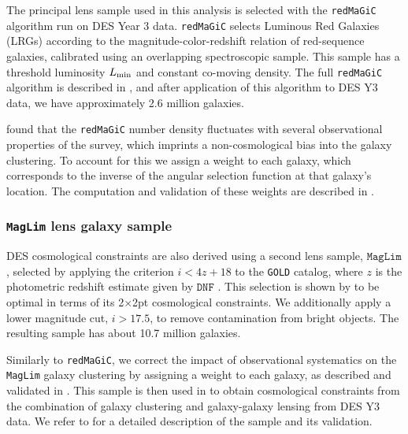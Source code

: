 \documentclass[aps, prd,twocolumn,superscriptaddress,nofootinbib,preprintnumbers]{revtex4-1}
\newcommand{\redmagic}{\texttt{redMaGiC} }
\newcommand{\maglim}{\texttt{MagLim} }
\newcommand{\gold}{\texttt{GOLD} }
\newcommand{\blue}[1]{\textcolor{blue}{#1}}
\begin{document}
The principal lens sample used in this analysis is selected with the \redmagic algorithm \citep{Rozo_2016} run on DES Year 3 data. \redmagic selects Luminous Red Galaxies (LRGs) according to the magnitude-color-redshift relation of red-sequence galaxies, calibrated using an overlapping spectroscopic sample.
This sample has a threshold luminosity $L_{\rm min}$ and constant co-moving density. The full \redmagic algorithm is described in \citet{Rozo_2016}, and after application of this algorithm to DES Y3 data, we have approximately 2.6 million galaxies.


\citet*{y3-galaxyclustering} found that the \redmagic number density fluctuates with several observational properties of the survey, which imprints a non-cosmological bias into the galaxy clustering. To account for this we assign a weight to each galaxy, which corresponds to the inverse of the angular selection function at that galaxy's location. The computation and validation of these weights are described in \cite{y3-galaxyclustering}.  


\subsubsection{\maglim lens galaxy sample}

DES cosmological constraints are also derived using a second
lens sample, $\maglim$, selected by applying the criterion  $i < 4z+18$ to the \gold catalog, where $z$ is the photometric redshift estimate given by $\texttt{DNF}$ \citep{DNF2016}.
This selection is shown by \citet*{y3-2x2maglimforecast} to be optimal in terms of its 2$\times$2pt cosmological constraints.
We additionally apply a lower magnitude cut, $i>17.5$, to remove contamination from bright objects. The resulting sample has about 10.7 million galaxies. 

Similarly to \texttt{redMaGiC}, we correct the impact of observational systematics on the \maglim galaxy clustering by assigning a weight to each galaxy, as described and validated in \cite{y3-galaxyclustering}. This sample is then used in \citet*{y3-2x2ptaltlensresults} to obtain cosmological constraints from the combination of galaxy clustering and galaxy-galaxy lensing from DES Y3 data. We refer to \cite{y3-2x2ptaltlensresults} for a detailed description of the sample and its validation.
\end{document}

